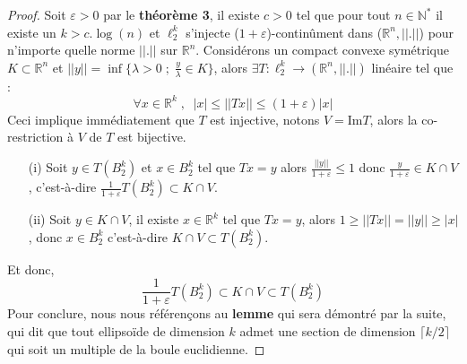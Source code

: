 \documentclass[12pt]{article}
\theoremstyle{definition}
\begin{document}
\begin{proof}
Soit $\varepsilon>0$ par le \textbf{théorème 3}, il existe $c>0$ tel que pour tout $n\in\mathbb{N}^*$ il existe un $k>c.\log(n)$ et $\ell_2^k$ s'injecte ($1+\varepsilon$)-continûment dans ($\mathbb{R}^n,||.||$) pour n’importe quelle norme $||.||$ sur $\mathbb{R}^n$. Considérons un compact convexe symétrique $K\subset \mathbb{R}^n$ et $||y||=\inf\Big\{\lambda>0\; ;\; \frac{y}{\lambda}\in K\Big\}$, alors $\exists T :\ell^{k}_2\to(\mathbb{R}^n,||.||)$ linéaire tel que :
\begin{equation*}
\forall x \in \mathbb{R}^k \; , \;\; |x|\leq ||Tx||\leq (1+\varepsilon)|x|
\end{equation*}
Ceci implique immédiatement que $T$ est injective, notons $V=\text{Im}T$, alors la co-restriction à $V$ de $T$ est bijective.
\begin{enumerate}
	\item[(i)]Soit $y\in T\left(B_2^k\right)$ et $x\in B_2^k$ tel que $Tx=y$ alors $\frac{||y||}{1+\varepsilon}\leq 1$ donc $\frac{y}{1+\varepsilon}\in K\cap V$, c'est-à-dire $\frac{1}{1+\varepsilon}T\left(B_2^k\right)\subset K\cap V$.
	\item[(ii)] Soit $y\in K\cap V$, il existe $x\in \mathbb{R}^k$ tel que $Tx=y$, alors $1\geq ||Tx||=||y|| \geq |x|$, donc $x\in B_2^k$ c'est-à-dire $K\cap V\subset T\left(B_2^k\right)$.
\end{enumerate} 
Et donc,
\begin{equation*}
	\frac{1}{1+\varepsilon}T(B_2^k)\subset K\cap V \subset T(B_2^k)
\end{equation*}
Pour conclure, nous nous référençons au \textbf{lemme } qui sera démontré par la suite, qui dit que tout ellipsoïde de dimension $k$ admet une section de dimension $\lceil k/2\rceil$ qui soit un multiple de la boule euclidienne. 
\end{proof}
\newtheorem{lemme}[lemme]{Lemme}

\newtheorem{rem}[rem]{Remarque}

\newtheorem{proposition}[proposition]{Proposition}
\end{document}
